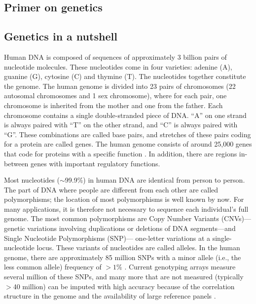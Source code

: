 \documentclass[12pt,a4paper]{article}
\begin{document}
\begin{bibunit}
\section{Primer on genetics} 
\label{appsec:genes}
\subsection{Genetics in a nutshell}
Human DNA is composed of sequences of approximately 3 billion pairs of nucleotide molecules. These nucleotides come in four varieties: adenine (A), guanine (G), cytosine (C) and thymine (T). The nucleotides together constitute the genome. The human genome is divided into 23 pairs of chromosomes (22 autosomal chromosomes and 1 sex chromosome), where for each pair, one chromosome is inherited from the mother and one from the father. Each chromosome contains a single double-stranded piece of DNA. ``A'' on one strand is always paired with ``T'' on the other strand, and ``C'' is always paired with ``G''. These combinations are called base pairs, and stretches of these pairs coding for a protein are called genes. The human genome consists of around 25,000 genes that code for proteins with a specific function \citep{sequencing2004finishing}. In addition, there are regions in-between genes with important regulatory functions. 

Most nucleotides ($\sim$99.9\%) in human DNA are identical from person to person. The part of DNA where people are different from each other are called polymorphisms; the location of most polymorphisms is well known by now. For many applications, it is therefore not necessary to sequence each individual's full genome. The most common polymorphisms are Copy Number Variants (CNVs)---genetic variations involving duplications or deletions of DNA segments---and Single Nucleotide Polymorphisms (SNP)--- one-letter variations at a single-nucleotide locus. These variants of nucleotides are called alleles. In the human genome, there are approximately 85 million SNPs with a minor allele (i.e., the less common allele) frequency of $>1\%$ \citep{1000Genomes2015}. Current genotyping arrays measure several million of these SNPs, and many more that are not measured (typically $>$40 million) can be imputed with high accuracy because of the correlation structure in the genome \citep[so-called linkage disequilibrium,][further explained below]{reich2001linkage} and the availability of large reference panels \citep{quick2019sequencing}. 


\end{bibunit}
\end{document}
